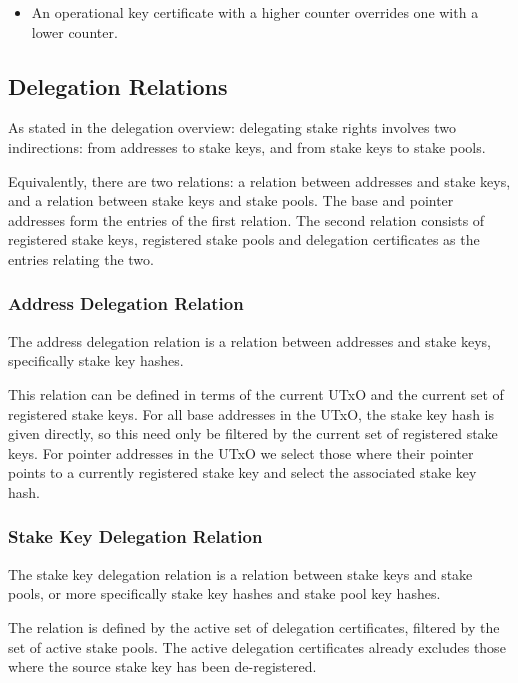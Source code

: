 \documentclass[11pt,a4paper]{article}
\begin{document}
\begin{itemize}
\item
  An operational key certificate with a higher counter overrides one with a
  lower counter.
\end{itemize}

\subsection{Delegation Relations}
\label{delegation-relations}

As stated in the delegation overview: delegating stake rights involves
two indirections: from addresses to stake keys, and from stake keys to
stake pools.

Equivalently, there are two relations: a relation between addresses and
stake keys, and a relation between stake keys and stake pools. The base
and pointer addresses form the entries of the first relation. The second
relation consists of registered stake keys, registered stake pools and
delegation certificates as the entries relating the two.

\subsubsection{Address Delegation Relation}
\label{address-delegation-relation}

The address delegation relation is a relation between addresses and
stake keys, specifically stake key hashes.

This relation can be defined in terms of the current UTxO and the
current set of registered stake keys. For all base addresses in the
UTxO, the stake key hash is given directly, so this need only be
filtered by the current set of registered stake keys. For pointer
addresses in the UTxO we select those where their pointer points to a
currently registered stake key and select the associated stake key hash.

\subsubsection{Stake Key Delegation Relation}
\label{stake-key-delegation-relation}

The stake key delegation relation is a relation between stake keys and
stake pools, or more specifically stake key hashes and stake pool key
hashes.

The relation is defined by the active set of delegation certificates,
filtered by the set of active stake pools. The active delegation
certificates already excludes those where the source stake key has
been de-registered.
\end{document}
